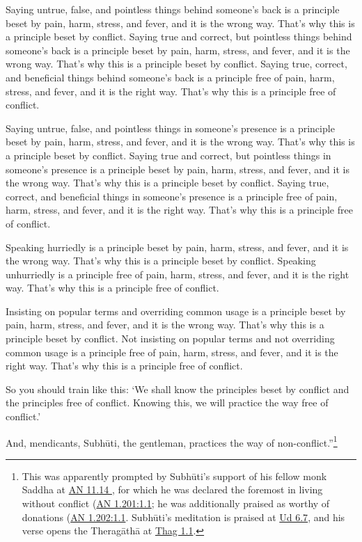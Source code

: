 \documentclass[12pt,openany]{book}%
\begin{document}
Saying untrue, false, and pointless things behind someone’s back is a principle beset by pain, harm, stress, and fever, and it is the wrong way. That’s why this is a principle beset by conflict. Saying true and correct, but pointless things behind someone’s back is a principle beset by pain, harm, stress, and fever, and it is the wrong way. That’s why this is a principle beset by conflict. Saying true, correct, and beneficial things behind someone’s back is a principle free of pain, harm, stress, and fever, and it is the right way. That’s why this is a principle free of conflict. 

Saying untrue, false, and pointless things in someone’s presence is a principle beset by pain, harm, stress, and fever, and it is the wrong way. That’s why this is a principle beset by conflict. Saying true and correct, but pointless things in someone’s presence is a principle beset by pain, harm, stress, and fever, and it is the wrong way. That’s why this is a principle beset by conflict. Saying true, correct, and beneficial things in someone’s presence is a principle free of pain, harm, stress, and fever, and it is the right way. That’s why this is a principle free of conflict. 

Speaking hurriedly is a principle beset by pain, harm, stress, and fever, and it is the wrong way. That’s why this is a principle beset by conflict. Speaking unhurriedly is a principle free of pain, harm, stress, and fever, and it is the right way. That’s why this is a principle free of conflict. 

Insisting on popular terms and overriding common usage is a principle beset by pain, harm, stress, and fever, and it is the wrong way. That’s why this is a principle beset by conflict. Not insisting on popular terms and not overriding common usage is a principle free of pain, harm, stress, and fever, and it is the right way. That’s why this is a principle free of conflict. 

So you should train like this: ‘We shall know the principles beset by conflict and the principles free of conflict. Knowing this, we will practice the way free of conflict.’ 

And, mendicants, \textsanskrit{Subhūti}, the gentleman, practices the way of non-conflict.”\footnote{This was apparently prompted by \textsanskrit{Subhūti}’s support of his fellow monk Saddha at \href{https://suttacentral.net/an11.14 /en/sujato}{AN 11.14 }, for which he was declared the foremost in living without conflict (\href{https://suttacentral.net/an1.201/en/sujato\#1.1}{AN 1.201:1.1}; he was additionally praised as worthy of donations (\href{https://suttacentral.net/an1.202/en/sujato\#1.1}{AN 1.202:1.1}. \textsanskrit{Subhūti}’s meditation is praised at \href{https://suttacentral.net/ud6.7/en/sujato}{Ud 6.7}, and his verse opens the \textsanskrit{Theragāthā} at \href{https://suttacentral.net/thag1.1/en/sujato}{Thag 1.1}. } 
\end{document}

